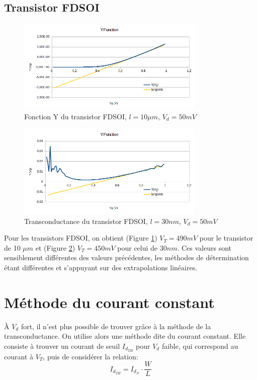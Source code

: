 \documentclass[a4paper,11pt]{report}
\begin{document}
\subsection{Transistor FDSOI}
\begin{figure}[h]
    \begin{center}
        \includegraphics[width=0.8\textwidth]{Images/FD1-10-YFunction}
        \caption{Fonction Y du transistor FDSOI, $l=10\mu m$, $V_d = 50mV$}
        \label{yfun_fdsoi_10um}
    \end{center}
\end{figure}
\begin{figure}[h]
    \begin{center}
        \includegraphics[width=0.8\textwidth]{Images/FD11-30-YFunction}
        \caption{Transconductance du transistor FDSOI, $l=30nm$, $V_d = 50mV$}
        \label{yfun_fdsoi_30nm}
    \end{center}
\end{figure}

Pour les transistors FDSOI, on obtient (Figure \ref{yfun_fdsoi_10um}) $V_T=490mV$ pour le transistor de 10 $\mu m$ et (Figure \ref{yfun_fdsoi_30nm}) $V_T=450mV$ pour celui de $30nm$. Ces valeurs sont sensiblement différentes des valeurs précédentes, les méthodes de détermination étant différentes et s'appuyant sur des extrapolations linéaires.


\section{Méthode du courant constant}
À $V_d$ fort, il n'est plus possible de trouver grâce à la méthode de la transconductance. On utilise alors une méthode dite du courant constant. Elle consiste à trouver un courant de seuil $I_{d_{TH}}$ pour $V_d$ faible, qui correspond au courant à $V_T$, puis de considérer la relation: \[I_{d_{TH}}=I_{d_{N}}\cdot\dfrac{W}{L}\]
\end{document}
